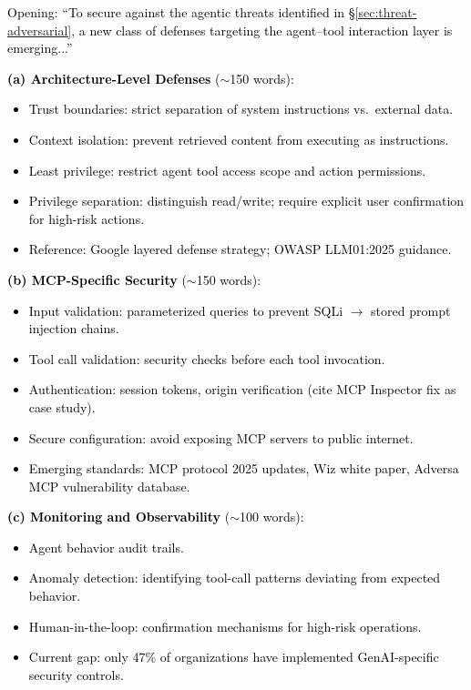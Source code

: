 \documentclass[preprint,12pt]{elsarticle}
\newcommand{\outline}[1]{\textcolor{black}{#1}}
\begin{document}
\outline{%
Opening: ``To secure against the agentic threats identified in \S\ref{sec:threat-adversarial}, a new class of defenses targeting the agent--tool interaction layer is emerging...''

\medskip\noindent\textbf{(a) Architecture-Level Defenses} ($\sim$150 words):
\begin{itemize}[nosep,leftmargin=1.5em]
    \item Trust boundaries: strict separation of system instructions vs.\ external data.
    \item Context isolation: prevent retrieved content from executing as instructions.
    \item Least privilege: restrict agent tool access scope and action permissions.
    \item Privilege separation: distinguish read/write; require explicit user confirmation for high-risk actions.
    \item Reference: Google layered defense strategy; OWASP LLM01:2025 guidance.
\end{itemize}

\medskip\noindent\textbf{(b) MCP-Specific Security} ($\sim$150 words):
\begin{itemize}[nosep,leftmargin=1.5em]
    \item Input validation: parameterized queries to prevent SQLi $\to$ stored prompt injection chains.
    \item Tool call validation: security checks before each tool invocation.
    \item Authentication: session tokens, origin verification (cite MCP Inspector fix as case study).
    \item Secure configuration: avoid exposing MCP servers to public internet.
    \item Emerging standards: MCP protocol 2025 updates, Wiz white paper, Adversa MCP vulnerability database.
\end{itemize}

\medskip\noindent\textbf{(c) Monitoring and Observability} ($\sim$100 words):
\begin{itemize}[nosep,leftmargin=1.5em]
    \item Agent behavior audit trails.
    \item Anomaly detection: identifying tool-call patterns deviating from expected behavior.
    \item Human-in-the-loop: confirmation mechanisms for high-risk operations.
    \item Current gap: only 47\% of organizations have implemented GenAI-specific security controls.
\end{itemize}

}
\end{document}
